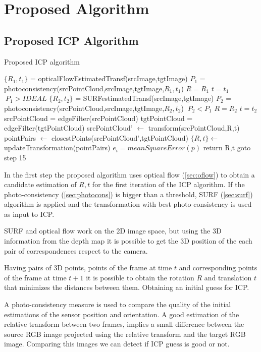 \section{Proposed Algorithm}

\subsection{Proposed ICP Algorithm}

\begin{algorithm}
\caption{Proposed ICP algorithm}
\begin{algorithmic}[1]
\State $\{R_1,t_1\}$ = opticalFlowEstimatedTransf(srcImage,tgtImage)
\State $P_1$ = photoconsistency(srcPointCloud,srcImage,tgtImage,$R_1,t_1$)
\State $R=R_1$
\State $t=t_1$
\If $\ P_1 > IDEAL$
    \State $\{R_2,t_2\}$ = SURFestimatedTransf(srcImage,tgtImage)
    \State  $P_2$ = photoconsistency(srcPointCloud,srcImage,tgtImage,$R_2,t_2$)
    \If $\ P_2 < P_1$
        \State $R=R_2$
        \State $t=t_2$
    \EndIf
\EndIf
\State srcPointCloud = edgeFilter(srcPointCloud)
\State tgtPointCloud = edgeFilter(tgtPointCloud)
\State srcPointCloud' $\leftarrow$ transform(srcPointCloud,R,t) 
\State pointPairs $\leftarrow$ closestPoints(srcPointCloud',tgtPointCloud)
\State $\{R,t\} \gets$ updateTransformation(pointPairs)
\State $e_i = meanSquareError(p)$
	\State return R,t
\Else
	\State goto step 15
\EndIf
\end{algorithmic}
\end{algorithm}


In the first step the proposed algorithm uses optical flow (\ref{sec:oflow}) to obtain a candidate estimation of 
$R,t$ for the first iteration of the ICP algorithm. If the photo-consistency (\ref{sec:photocons}) is bigger than a threshold, 
SURF (\ref{sec:surf}) algorithm is applied and the transformation with best photo-consistency is used as input to ICP.

SURF and optical flow work on the 2D image space, but using 
the 3D information from the depth map it is possible to get the 3D position 
of the each pair of correspondences respect to the camera. 

Having pairs of 3D points, points of the frame at time $t$ and corresponding points 
of the frame at time $t + 1$ it is possible to obtain the rotation $R$ and translation $t$
 that minimizes the distances between them. Obtaining an initial guess 
 for ICP. 

A photo-consistency measure is used to compare the quality of the initial estimations of the sensor
 position and orientation. A good estimation of the relative transform between two frames, implies 
a small difference between the source RGB image projected using the relative transform and the target RGB 
image. Comparing this images we can detect if ICP guess is good or not.

